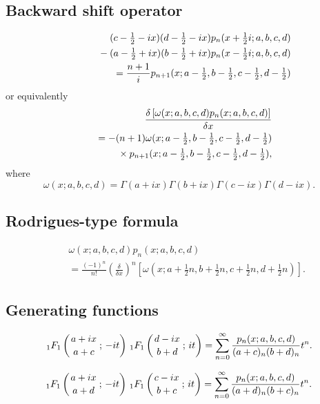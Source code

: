 \documentclass[envcountchap,graybox]{svmono}
\newcommand{\hyp}[5]{\mbox{}_{#1}{F}_{#2}
\left(\genfrac{}{}{0pt}{}{#3}{#4}\,;\,#5\right)}
\newcommand{\mathindent}{\hspace{7.5mm}}
\renewcommand{\Gamma}{\varGamma}
\begin{document}
\subsection*{Backward shift operator}
\begin{eqnarray}
\label{shift2ContHahnI}
& &(c-\textstyle\frac{1}{2}-ix)(d-\textstyle\frac{1}{2}-ix)
p_n(x+\textstyle\frac{1}{2}i;a,b,c,d)\nonumber\\
& &{}\mathindent{}-(a-\textstyle\frac{1}{2}+ix)(b-\textstyle\frac{1}{2}+ix)
p_n(x-\textstyle\frac{1}{2}i;a,b,c,d)\nonumber\\
& &{}=\frac{n+1}{i}p_{n+1}(x;a-\textstyle\frac{1}{2},
b-\textstyle\frac{1}{2},c-\textstyle\frac{1}{2},d-\textstyle\frac{1}{2})
\end{eqnarray}
or equivalently
\begin{eqnarray}
\label{shift2ContHahnII}
& &\frac{\delta\left[\omega(x;a,b,c,d)p_n(x;a,b,c,d)\right]}{\delta x}\nonumber\\
& &{}=-(n+1)\omega(x;a-\textstyle\frac{1}{2},b-\textstyle\frac{1}{2},
c-\textstyle\frac{1}{2},d-\textstyle\frac{1}{2})\nonumber\\
& &{}\mathindent\times p_{n+1}(x;a-\textstyle\frac{1}{2},b-\textstyle\frac{1}{2},c-\textstyle\frac{1}{2},d-\textstyle\frac{1}{2}),
\end{eqnarray}
where
$$\omega(x;a,b,c,d)=\Gamma(a+ix)\Gamma(b+ix)\Gamma(c-ix)\Gamma(d-ix).$$

\subsection*{Rodrigues-type formula}
\begin{eqnarray}
\label{RodContHahn}
& &\omega(x;a,b,c,d)p_n(x;a,b,c,d)\nonumber\\
& &{}=\frac{(-1)^n}{n!}\left(\frac{\delta}{\delta x}\right)^n
\left[\omega(x;a+\textstyle\frac{1}{2}n,b+\textstyle\frac{1}{2}n,
c+\textstyle\frac{1}{2}n,d+\textstyle\frac{1}{2}n)\right].
\end{eqnarray}

\subsection*{Generating functions}
\begin{equation}
\label{GenContHahn1}
\hyp{1}{1}{a+ix}{a+c}{-it}\,\hyp{1}{1}{d-ix}{b+d}{it}=
\sum_{n=0}^{\infty}\frac{p_n(x;a,b,c,d)}{(a+c)_n(b+d)_n}t^n.
\end{equation}

\begin{equation}
\label{GenContHahn2}
\hyp{1}{1}{a+ix}{a+d}{-it}\,\hyp{1}{1}{c-ix}{b+c}{it}=
\sum_{n=0}^{\infty}\frac{p_n(x;a,b,c,d)}{(a+d)_n(b+c)_n}t^n.
\end{equation}
\end{document}
